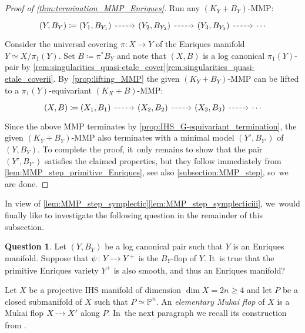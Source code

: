 \documentclass[JEP,XML,SOM,Unicode,published]{cedram}
\newcommand{\dradpl}{{\hspace*{-2.5mm}\begin{tikzcd}[ampersand replacement=\&,column sep = scriptsize]\mbox{}\ar[r,dashed]\&\mbox{}\end{tikzcd}\hspace*{-2.5mm}}}
\newcommand{\dratst}{{\hspace*{-2.5mm}\begin{tikzcd}[ampersand replacement=\&,column sep = small]\mbox{}\ar[r,dashed]\&\mbox{}\end{tikzcd}\hspace*{-2mm}}}
\let\drascst\dratst
\newcommand{\dra}{\mathchoice{\dradpl}{\dratst}{\drascst}{\drascst}}
\theoremstyle{plain}
\theoremstyle{definition}
\newtheorem{question}[thm]{Question}
\begin{document}
\begin{proof}[Proof of \autoref{thm:termination_MMP_Enriques}]
Run any $(K_Y+B_Y)$-MMP:
\[
\begin{tikzcd}
(Y,B_Y) \coloneqq (Y_1,B_{Y_1}) \arrow[r, dashed] & (Y_2,B_{Y_2}) \arrow[r, dashed] & (Y_3,B_{Y_3}) \arrow[r, dashed] & \cdots
\end{tikzcd}
\]
Consider the universal covering $\pi \colon X \to Y$ of the Enriques manifold $Y \simeq X / \pi_1(Y)$.
Set $B \coloneqq \pi^* B_Y$ and note that $(X,B)$ is a log canonical $\pi_1(Y)$-pair by \autoref{rem:singularities_quasi-etale_cover}\eqref{rem:singularities_quasi-etale_coverii}. By~\autoref{prop:lifting_MMP} the given $(K_Y + B_Y)$-MMP can be lifted to a $\pi_1(Y)$-equivariant $(K_X+B)$-MMP:
\[
\begin{tikzcd}
(X,B) \coloneqq (X_1,B_1)
\arrow[r, dashed] & (X_2,B_2)
\arrow[r, dashed] & (X_3,B_3)
\arrow[r, dashed] & \cdots
\end{tikzcd}
\]
Since the above MMP terminates by \autoref{prop:IHS_G-equivariant_termination}, the given $(K_Y+B_Y)$-MMP also terminates with a minimal model $(Y',B_{Y'})$ of $(Y,B_Y)$.
To complete the proof, it~only remains to show that the pair $(Y',B_{Y'})$ satisfies the claimed properties, but they follow immediately from \autoref{lem:MMP_step_primitive_Enriques}, see also \autoref{subsection:MMP_step}, so~we are done.
\end{proof}

In view of \autoref{lem:MMP_step_symplectic}\eqref{lem:MMP_step_symplecticiii}, we~would finally like to investigate the following question in the remainder of this subsection.

\begin{question}
\label{question:flop_of_Enriques_manifold}
Let $(Y,B_Y)$ be a log canonical pair such that $Y$ is an Enriques manifold. Suppose that $\psi \colon Y \dra Y^+$ is the $B_Y$-flop of $Y$. It~is true that the primitive Enriques variety $Y^+$ is also smooth, and thus an Enriques manifold?
\end{question}

Let $X$ be a projective IHS manifold of dimension $\dim X = 2n \geq 4$ and let $P$ be a closed submanifold of $X$ such that $P \simeq \mathbb{P}^n$. An \emph{elementary Mukai flop} of $X$ is a Mukai flop $X\dra X'$ along $P$. In~the next paragraph we recall its construction from \cite[Ex.\,21.7]{GHJ03book}.
\end{document}
